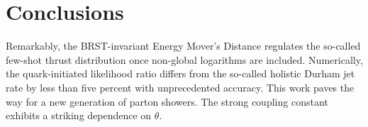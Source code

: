 \section{Conclusions}\label{sec:conclusions}

Remarkably, the BRST-invariant Energy Mover's Distance regulates the
so-called few-shot thrust distribution once non-global logarithms are
included. Numerically, the quark-initiated likelihood ratio differs from
the so-called holistic Durham jet rate by less than five percent with
unprecedented accuracy. This work paves the way for a new generation of
parton showers. The strong coupling constant exhibits a striking
dependence on $\theta$.


